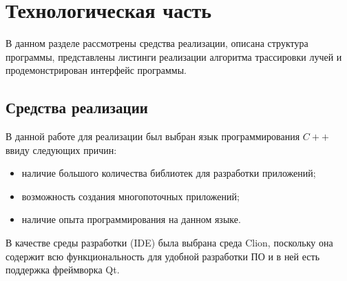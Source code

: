 \chapter{Технологическая часть}

В данном разделе рассмотрены средства реализации, описана структура программы, представлены листинги реализации алгоритма трассировки лучей и продемонстрирован интерфейс программы.

\section{Средства реализации}
В данной работе для реализации был выбран язык программирования $C++$ ввиду следующих причин:
\begin{itemize}[label=---]
	\item наличие большого количества библиотек для разработки приложений;
	\item возможность создания многопоточных приложений;
	\item наличие опыта программирования на данном языке.
\end{itemize}

В качестве среды разработки (IDE) была выбрана среда Clion, поскольку она содержит всю функциональность для удобной разработки ПО и в ней есть поддержка фреймворка Qt.


